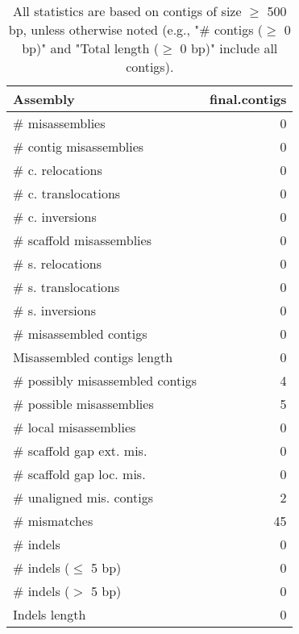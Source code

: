 \documentclass[12pt,a4paper]{article}
\begin{document}
\begin{table}[ht]
\begin{center}
\caption{All statistics are based on contigs of size $\geq$ 500 bp, unless otherwise noted (e.g., "\# contigs ($\geq$ 0 bp)" and "Total length ($\geq$ 0 bp)" include all contigs).}
\begin{tabular}{|l*{1}{|r}|}
\hline
Assembly & final.contigs \\ \hline
\# misassemblies & 0 \\ \hline
\hspace{2mm}\# contig misassemblies & 0 \\ \hline
\hspace{5mm}\# c. relocations & 0 \\ \hline
\hspace{5mm}\# c. translocations & 0 \\ \hline
\hspace{5mm}\# c. inversions & 0 \\ \hline
\hspace{2mm}\# scaffold misassemblies & 0 \\ \hline
\hspace{5mm}\# s. relocations & 0 \\ \hline
\hspace{5mm}\# s. translocations & 0 \\ \hline
\hspace{5mm}\# s. inversions & 0 \\ \hline
\# misassembled contigs & 0 \\ \hline
Misassembled contigs length & 0 \\ \hline
\# possibly misassembled contigs & 4 \\ \hline
\hspace{5mm}\# possible misassemblies & 5 \\ \hline
\# local misassemblies & 0 \\ \hline
\# scaffold gap ext. mis. & 0 \\ \hline
\# scaffold gap loc. mis. & 0 \\ \hline
\# unaligned mis. contigs & 2 \\ \hline
\# mismatches & 45 \\ \hline
\# indels & 0 \\ \hline
\hspace{5mm}\# indels ($\leq$ 5 bp) & 0 \\ \hline
\hspace{5mm}\# indels ($>$ 5 bp) & 0 \\ \hline
Indels length & 0 \\ \hline
\end{tabular}
\end{center}
\end{table}
\end{document}
